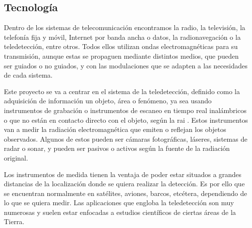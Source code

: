 \subsection{Tecnología}
\par Dentro de los sistemas de telecomunicación encontramos la radio, la televisión, la telefonía fija y móvil, Internet por banda ancha o datos, la radionavegación o la teledetección, entre otros. Todos ellos utilizan ondas electromagnéticas para su transmisión, aunque estas se propaguen mediante distintos medios, que pueden ser guiados o no guiados, y con las modulaciones que se adapten a las necesidades de cada sistema. 
\\
\par Este proyecto se va a centrar en el sistema de la teledetección, definido como la adquisición de información un objeto, área o fenómeno, ya sea usando instrumentos de grabación o instrumentos de escaneo en tiempo real inalámbricos o que no están en contacto directo con el objeto, según la \gls{rai} \cite{RAI}. Estos instrumentos van a medir la radiación electromagnética que emiten o reflejan los objetos observados. Algunos de estos pueden ser cámaras fotográficas, láseres, sistemas de radar o sonar, y pueden ser pasivos o activos según la fuente de la radiación original.
\\
\par Los instrumentos de medida tienen la ventaja de poder estar situados a grandes distancias de la localización donde se quiera realizar la detección. Es por ello que se encuentran normalmente en satélites, aviones, barcos, etcétera, dependiendo de lo que se quiera medir. Las aplicaciones que engloba la teledetección son muy numerosas y suelen estar enfocadas a estudios científicos de ciertas áreas de la Tierra. 
